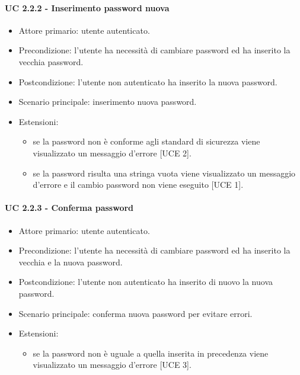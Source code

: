         \paragraph{UC 2.2.2 - Inserimento password nuova}
            \begin{itemize}
                \item Attore primario: utente autenticato.
                \item Precondizione: l'utente ha necessità di cambiare password ed ha inserito la vecchia password.
                \item Postcondizione: l'utente non autenticato ha inserito la nuova password.
                \item Scenario principale: inserimento nuova password.
                \item Estensioni:
                    \begin{itemize}
                        \item se la password non è conforme agli standard di sicurezza viene visualizzato un messaggio d'errore [UCE 2].
                        \item se la password risulta una stringa vuota viene visualizzato un messaggio d'errore e il cambio password non viene eseguito [UCE 1].
                    \end{itemize}
            \end{itemize}
        \paragraph{UC 2.2.3 - Conferma password}
            \begin{itemize}
                \item Attore primario: utente autenticato.
                \item Precondizione: l'utente ha necessità di cambiare password ed ha inserito la vecchia e la nuova password.
                \item Postcondizione: l'utente non autenticato ha inserito di nuovo la nuova password.
                \item Scenario principale: conferma nuova password per evitare errori.
                \item Estensioni:
                    \begin{itemize}
                        \item se la password non è uguale a quella inserita in precedenza viene visualizzato un messaggio d'errore [UCE 3].
                    \end{itemize}
            \end{itemize}
